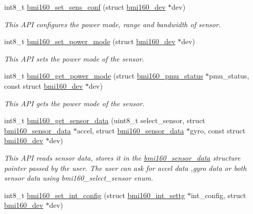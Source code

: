 \begin{DoxyCompactItemize}
int8\+\_\+t \hyperlink{group__bmi160_gab098d2c7fda2965b1699ae13d2a8ffc8}{bmi160\+\_\+set\+\_\+sens\+\_\+conf} (struct \hyperlink{structbmi160__dev}{bmi160\+\_\+dev} $\ast$dev)
\begin{DoxyCompactList}\small\item\em This A\+PI configures the power mode, range and bandwidth of sensor. \end{DoxyCompactList}\item 
int8\+\_\+t \hyperlink{group__bmi160_ga897ca5f1bfbcd1385ace2c05f9f4aef6}{bmi160\+\_\+set\+\_\+power\+\_\+mode} (struct \hyperlink{structbmi160__dev}{bmi160\+\_\+dev} $\ast$dev)
\begin{DoxyCompactList}\small\item\em This A\+PI sets the power mode of the sensor. \end{DoxyCompactList}\item 
int8\+\_\+t \hyperlink{group__bmi160_gacf4792d76eafc7607a097c79fcadb92a}{bmi160\+\_\+get\+\_\+power\+\_\+mode} (struct \hyperlink{structbmi160__pmu__status}{bmi160\+\_\+pmu\+\_\+status} $\ast$pmu\+\_\+status, const struct \hyperlink{structbmi160__dev}{bmi160\+\_\+dev} $\ast$dev)
\begin{DoxyCompactList}\small\item\em This A\+PI gets the power mode of the sensor. \end{DoxyCompactList}\item 
int8\+\_\+t \hyperlink{group__bmi160_ga86fb957a2384daa2ac17345d76b7e976}{bmi160\+\_\+get\+\_\+sensor\+\_\+data} (uint8\+\_\+t select\+\_\+sensor, struct \hyperlink{structbmi160__sensor__data}{bmi160\+\_\+sensor\+\_\+data} $\ast$accel, struct \hyperlink{structbmi160__sensor__data}{bmi160\+\_\+sensor\+\_\+data} $\ast$gyro, const struct \hyperlink{structbmi160__dev}{bmi160\+\_\+dev} $\ast$dev)
\begin{DoxyCompactList}\small\item\em This A\+PI reads sensor data, stores it in the \hyperlink{structbmi160__sensor__data}{bmi160\+\_\+sensor\+\_\+data} structure pointer passed by the user. The user can ask for accel data ,gyro data or both sensor data using bmi160\+\_\+select\+\_\+sensor enum. \end{DoxyCompactList}\item 
int8\+\_\+t \hyperlink{group__bmi160_ga62ebd142768bea09f93ab63786dc3cca}{bmi160\+\_\+set\+\_\+int\+\_\+config} (struct \hyperlink{structbmi160__int__settg}{bmi160\+\_\+int\+\_\+settg} $\ast$int\+\_\+config, struct \hyperlink{structbmi160__dev}{bmi160\+\_\+dev} $\ast$dev)

\end{DoxyCompactItemize}
